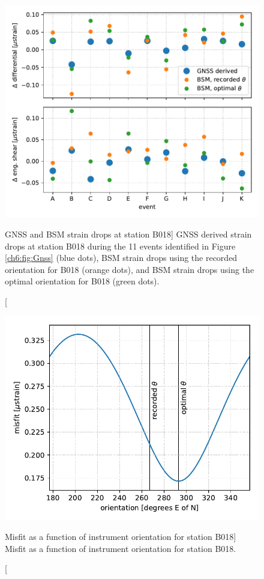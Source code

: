 \begin{figure}
\includegraphics{ch6/figures/fit.pdf}
\caption
[GNSS and BSM strain drops at station B018]
{GNSS derived strain drops at station B018 during the 11
events identified in Figure \ref{ch6:fig:Gnss} (blue dots), BSM strain
drops using the recorded orientation for B018 (orange dots), and BSM
strain drops using the optimal orientation for B018 (green dots).}
\label{ch6:fig:Fit}
\end{figure}

\begin{figure}
\includegraphics{ch6/figures/misfit.pdf}
\caption
[Misfit as a function of instrument orientation for station
B018]
{Misfit as a function of instrument orientation for station
B018.}
\label{ch6:fig:Misfit}
\end{figure}

